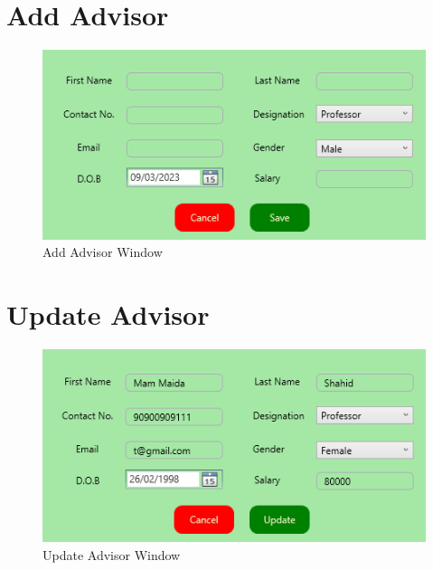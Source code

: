 \documentclass[a4paper, 12pt, oneside]{uet_thesis}
\begin{document}
\section{Add Advisor}
\begin{figure}[h]
    \centering
    \includegraphics[width=1\textwidth]{Figures/AddAdvisor.png}
    \caption{Add Advisor Window}
    \label{fig:my_label}
\end{figure}
\clearpage

\section{Update Advisor}
\begin{figure}[h]
    \centering
    \includegraphics[width=1\textwidth]{Figures/UpdateAdvisor.png}
    \caption{Update Advisor Window}
    \label{fig:my_label}
\end{figure}
\end{document}
